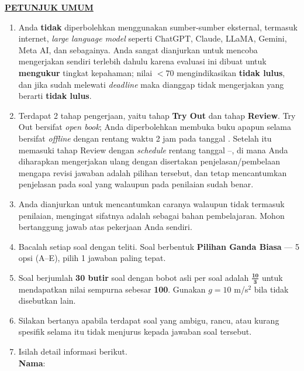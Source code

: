 \documentclass[11pt]{article}
\begin{document}
\noindent\textbf{\underline{PETUNJUK UMUM}}
\begin{enumerate}[leftmargin=*,itemsep=4pt,topsep=4pt]
  \item Anda \textbf{tidak} diperbolehkan menggunakan sumber-sumber eksternal,
        termasuk internet, \textit{large language model} seperti ChatGPT, Claude,
        LLaMA, Gemini, Meta AI, dan sebagainya. Anda sangat dianjurkan untuk
        mencoba mengerjakan sendiri terlebih dahulu karena evaluasi ini dibuat
        untuk \textbf{mengukur} tingkat kepahaman; nilai $<70$ mengindikasikan
        \textbf{tidak lulus}, dan jika sudah melewati \textit{deadline} maka
        dianggap tidak mengerjakan yang berarti \textbf{tidak lulus}.

  \item Terdapat 2 tahap pengerjaan, yaitu tahap \textbf{Try Out} dan tahap
        \textbf{Review}. Try Out bersifat \textit{open book}; Anda diperbolehkan
        membuka buku apapun selama bersifat \textit{offline} dengan rentang waktu
        2 jam pada tanggal \underline{\hspace{3cm}}. Setelah itu memasuki
        tahap Review dengan \textit{schedule} rentang tanggal
        \underline{\hspace{3cm}}--\underline{\hspace{3cm}}, di mana Anda
        diharapkan mengerjakan ulang dengan disertakan penjelasan/pembelaan
        mengapa revisi jawaban adalah pilihan tersebut, dan tetap mencantumkan
        penjelasan pada soal yang walaupun pada penilaian sudah benar.

  \item Anda dianjurkan untuk mencantumkan caranya walaupun tidak termasuk
        penilaian, mengingat sifatnya adalah sebagai bahan pembelajaran.
        Mohon bertanggung jawab atas pekerjaan Anda sendiri.

  \item Bacalah setiap soal dengan teliti. Soal berbentuk
        \textbf{Pilihan Ganda Biasa} --- 5 opsi (A--E), pilih 1 jawaban
        paling tepat.

  \item Soal berjumlah \textbf{30 butir} soal dengan bobot asli per soal adalah
        $\mathbf{\tfrac{10}{3}}$ untuk mendapatkan nilai sempurna sebesar \textbf{100}.
        Gunakan $g=10$ m/s$^2$ bila tidak disebutkan lain.

  \item Silakan bertanya apabila terdapat soal yang ambigu, rancu, atau kurang
        spesifik selama itu tidak menjurus kepada jawaban soal tersebut.

  \item Isilah detail informasi berikut.\\[0.3em]
        \textbf{Nama}\hspace{0.45cm}:\enspace\underline{\hspace{8cm}}
\end{enumerate}
\end{document}
